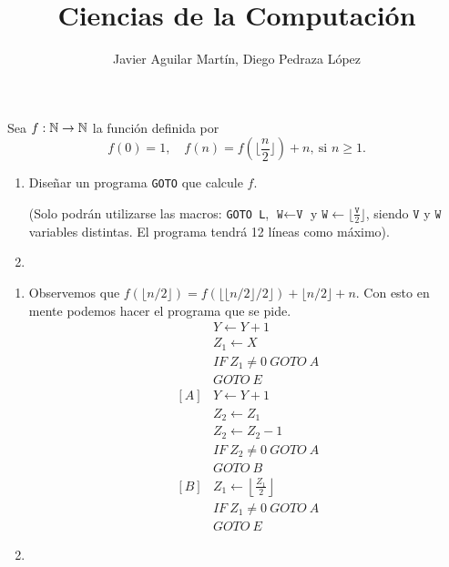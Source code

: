 \documentclass[twoside]{article}
\begin{document}
\title{Ciencias de la Computación}

\author{Javier Aguilar Martín, Diego Pedraza López}
\maketitle

\begin{ejercicio}{1}
Sea $f : \mathbb{N} \to \mathbb{N}$ la función definida por
$$f(0) = 1,\quad f(n) = f(\lfloor\frac{n}{2}\rfloor) + n,\ \text{si }n \geq 1.$$
\begin{enumerate}
\item Diseñar un programa \texttt{GOTO} que calcule $f$.

(Solo podrán utilizarse las macros: \texttt{GOTO L}, $\texttt{W}\leftarrow \texttt{V}$ y $\texttt{W}\leftarrow   \lfloor\frac{\texttt{V}}{2}\rfloor$, siendo $\texttt{V}$ y $\texttt{W}$ variables
distintas. El programa tendrá 12 líneas como máximo).
\item 
\end{enumerate}
\end{ejercicio}
\begin{solucion}
\begin{enumerate}
\item Observemos que $f(\lfloor n/2\rfloor)=f(\lfloor\lfloor n/2\rfloor/2\rfloor)+\lfloor n/2\rfloor+n$. Con esto en mente podemos hacer el programa que se pide.
\begin{align*}
& Y\leftarrow Y+1\\
&Z_1\leftarrow X\\
& IF\ Z_1\neq 0\ GOTO\ A\\
& GOTO\ E\\
[A]& Y\leftarrow Y+1\\
&Z_2\leftarrow Z_1\\
&Z_2\leftarrow Z_2-1\\
&IF\ Z_2\neq 0\ GOTO\ A\\
&GOTO\ B\\
[B]&Z_1\leftarrow \left\lfloor\frac{Z_1}{2}\right\rfloor\\
& IF\ Z_1\neq 0\ GOTO\ A\\
& GOTO\ E
\end{align*}


\item
\end{enumerate}
\end{solucion}

\newpage
\end{document}

